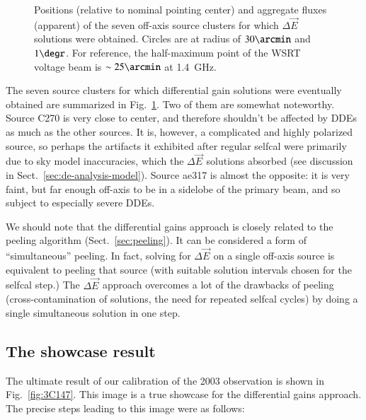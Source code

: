 \documentclass[]{aa}
\newcommand{\jones}[2]{\vec {#1}_{#2}}
\begin{document}
\begin{figure}
\caption{\label{fig:source-plot}Positions (relative to nominal pointing center) and aggregate fluxes (apparent) of the seven off-axis source clusters for which $\Delta\jones{E}{}$ solutions were obtained. Circles are at  radius of $30\arcmin$ and $1\degr$. For reference, the half-maximum point of the WSRT voltage beam is $\sim25\arcmin$ at 1.4~GHz.}
\end{figure}

The seven source clusters for which differential gain solutions were eventually obtained are summarized in Fig.~\ref{fig:source-plot}. Two of them are somewhat noteworthy. Source C270 is very close to center, and therefore shouldn't be affected by DDEs as much as the other sources. It is, however, a complicated and highly polarized source, so perhaps the artifacts it exhibited after regular selfcal were primarily due to sky model inaccuracies, which the $\Delta\jones{E}{}$ solutions absorbed (see discussion in Sect.~\ref{sec:de-analysis-model}). Source ae317 is almost the opposite: it is very faint, but far enough off-axis to be in a sidelobe of the primary beam, and so subject to especially severe DDEs.

We should note that the differential gains approach is closely related to the peeling algorithm (Sect.~\ref{sec:peeling}). It can be considered a form of ``simultaneous'' peeling. In fact, solving for $\Delta\jones{E}{}$ on a single off-axis source is equivalent to peeling that source (with suitable solution intervals chosen for the selfcal step.) The $\Delta\jones{E}{}$ approach overcomes a lot of the drawbacks of peeling (cross-contamination of solutions, the need for repeated selfcal cycles) by doing a single simultaneous solution in one step.


\subsection{The showcase result} 

The ultimate result of our calibration of the 2003 observation is shown in Fig.~\ref{fig:3C147}. This image is a true showcase for the differential gains approach. The precise steps leading to this image were as follows:
\end{document}
